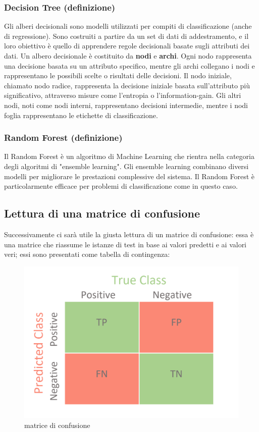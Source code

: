 \documentclass{article}
\begin{document}
\begin{titlepage}
        \subsubsection{Decision Tree (definizione)}
        Gli alberi decisionali sono modelli utilizzati per compiti di classificazione (anche di regressione). Sono costruiti a partire da un set di dati di addestramento, e il loro obiettivo è quello di apprendere regole decisionali basate sugli attributi dei dati.
        Un albero decisionale è costituito da \textbf{nodi} e \textbf{archi}. Ogni nodo rappresenta una decisione basata su un attributo specifico, mentre gli archi collegano i nodi e rappresentano le possibili scelte o risultati delle decisioni. Il nodo iniziale, chiamato nodo radice, rappresenta la decisione iniziale basata sull'attributo più significativo, attraverso misure come l’entropia
        o l’information-gain. Gli altri nodi, noti come nodi interni, rappresentano decisioni intermedie, mentre i nodi foglia rappresentano le etichette di classificazione.

        \subsubsection{Random Forest (definizione)}
         Il Random Forest è un algoritmo di Machine Learning che rientra nella categoria degli algoritmi di "ensemble learning". Gli ensemble learning combinano diversi modelli per migliorare le prestazioni complessive del sistema. Il Random Forest è particolarmente efficace per problemi di classificazione come in questo caso.
        \subsection{Lettura di una matrice di confusione}
        Successivamente ci sarà utile la giusta lettura di un matrice di confusione: essa è una  matrice che riassume le istanze di test in base ai valori
        predetti e ai valori veri; essi sono presentati come tabella di contingenza:
        \begin{figure}[ht]
            \centering
            \includegraphics[width=0.6\linewidth]{generic_confusion_matrix.png}
            \caption{  matrice di confusione}
            \label{fig:enter-label}
        \end{figure}
        

\end{titlepage}
\end{document}
